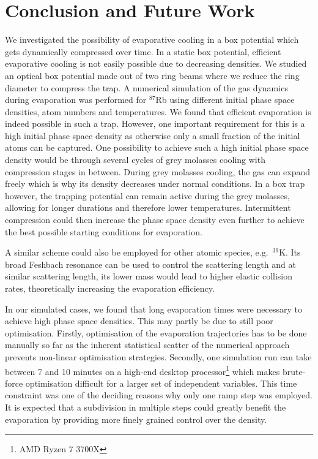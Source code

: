 

\chapter{Conclusion and Future Work}
We investigated the possibility of evaporative cooling in a box potential which gets dynamically compressed over time. In a static box potential, efficient evaporative cooling is not easily possible due to decreasing densities. We studied an optical box potential made out of two ring beams where we reduce the ring diameter to compress the trap. A numerical simulation of the gas dynamics during evaporation was performed for $^{87}$Rb using different initial phase space densities, atom numbers and temperatures. We found that efficient evaporation is indeed possible in such a trap. However, one important requirement for this is a high initial phase space density as otherwise only a small fraction of the initial atoms can be captured.
One possibility to achieve such a high initial phase space density would be through several cycles of grey molasses cooling with compression stages in between. During grey molasses cooling, the gas can expand freely which is why its density decreases under normal conditions. In a box trap however, the trapping potential can remain active during the grey molasses, allowing for longer durations and therefore lower temperatures. Intermittent compression could then increase the phase space density even further to achieve the best possible starting conditions for evaporation.

A similar scheme could also be employed for other atomic species, e.g.\ $^{39}$K. Its broad Feshbach resonance can be used to control the scattering length \cite{k39Feshbach} and at similar scattering length, its lower mass would lead to higher elastic collision rates, theoretically increasing the evaporation efficiency.

In our simulated cases, we found that long evaporation times were necessary to achieve high phase space densities. This may partly be due to still poor optimisation.
Firstly, optimisation of the evaporation trajectories has to be done manually so far as the inherent statistical scatter of the numerical approach prevents non-linear optimisation strategies. Secondly, one simulation run can take between 7 and 10 minutes on a high-end desktop processor\footnote{AMD Ryzen 7 3700X} which makes brute-force optimisation difficult for a larger set of independent variables. This time constraint was one of the deciding reasons why only one ramp step was employed. It is expected that a subdivision in multiple steps could greatly benefit the evaporation by providing more finely grained control over the density.

